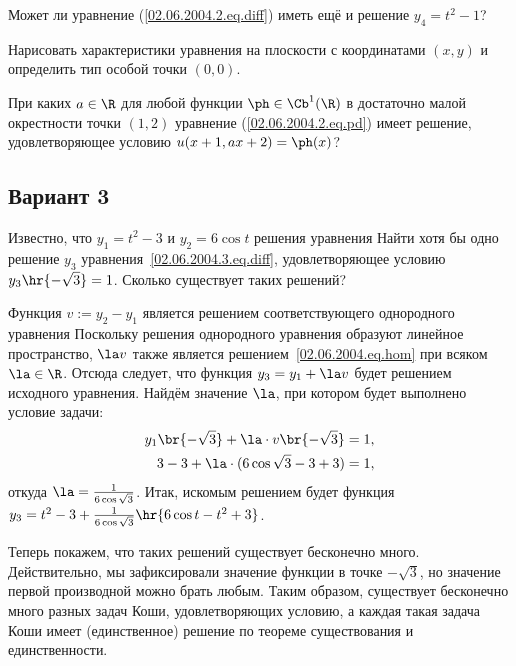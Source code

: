 \documentclass{article}
\begin{document}
\begin{problem}[2 балла]
Может ли уравнение (\ref{02.06.2004.2.eq.diff}) иметь ещё и решение $y_4 = t^2 -1$?
\end{problem}

\begin{problem}[2 балла]
Нарисовать характеристики уравнения
на плоскости с координатами $(x,y)$ и определить тип особой точки $(0,0)$.
\end{problem}

\begin{problem}[3 балла]
При каких $a \in \R$ для любой функции $\ph \in  \Cb^1(\R)$ в достаточно малой
окрестности точки $(1,2)$ уравнение (\ref{02.06.2004.2.eq.pd}) имеет решение, удовлетворяющее
условию $u(x+1,ax+2) = \ph(x)$?
\end{problem}

\setcounter{problem}{0}
\subsection{Вариант 3}

\begin{problem}[3 балла]
Известно, что $y_1=t^2-3$ и $y_2 = 6\cos t$ решения уравнения
Найти хотя бы одно решение $y_3$ уравнения~\eqref{02.06.2004.3.eq.diff}, удовлетворяющее
условию $y_3\hr{-\sqrt3} = 1$. Сколько существует таких решений?
\end{problem}
\begin{solution}
Функция $v := y_2 - y_1$ является решением соответствующего однородного уравнения
Поскольку решения однородного уравнения образуют линейное пространство, $\la v$ также является
решением~\eqref{02.06.2004.eq.hom} при всяком $\la \in \R$. Отсюда следует, что функция
$y_3 = y_1 + \la v$ будет решением исходного уравнения. Найдём значение $\la$, при котором будет выполнено
условие задачи:
\begin{eqnarray*}
y_1\br{-\sqrt3} + \la \cdot v\br{-\sqrt3} = 1,\\
3-3 + \la \cdot (6\cos\sqrt3 - 3 + 3) = 1,
\end{eqnarray*}
откуда $\la = \frac{1}{6\cos\sqrt3}$.
Итак, искомым решением будет функция
$y_3 = t^2-3 + \frac{1}{6\cos\sqrt3}\hr{6\cos t - t^2 + 3}$.

Теперь покажем, что таких решений существует бесконечно много. Действительно, мы зафиксировали
значение функции в точке $-\sqrt3$, но значение первой производной можно брать любым. Таким образом,
существует бесконечно много разных задач Коши, удовлетворяющих условию, а каждая такая задача Коши
имеет (единственное) решение по теореме существования и единственности.
\end{solution}
\end{document}
